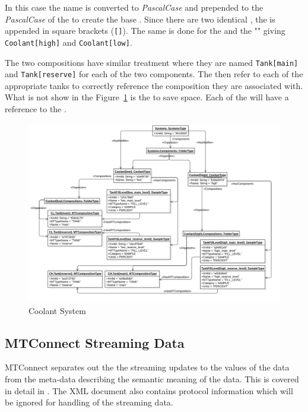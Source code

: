 In this case the  name is converted to \textit{PascalCase} and prepended to the \textit{PascalCase} of the  to create the base . Since there are two identical , the  is appended in square brackets (\texttt{[]}). The same is done for the   and the   "" giving \texttt{Coolant[high]} and \texttt{Coolant[low]}.

The two  compositions have similar treatment where they are named \texttt{Tank[main]} and \texttt{Tank[reserve]} for each of the two components. The  then refer to each of the appropriate tanks to correctly reference the composition they are associated with. What is not show in the Figure~\ref{fig:coolant-system} is the  to save space. Each of the  will have a  reference to the .

\begin{figure}[ht]
    \centering
    \includegraphics[width=1.0\textwidth]{diagrams/mtconnect-mapping/coolant-system.png}
    \caption{Coolant System}
    \label{fig:coolant-system}
\end{figure}

\FloatBarrier

\subsection{MTConnect Streaming Data}

MTConnect separates out the the streaming updates to the values of the data from the meta-data describing the semantic meaning of the data. This is covered in detail in \cite{MTCPart3}. The XML document also contains protocol information which will be ignored for handling of the streaming data. 

